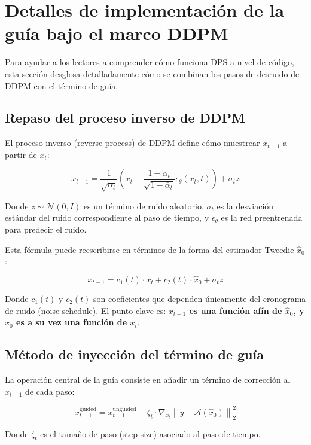 \section{Detalles de implementación de la guía bajo el marco DDPM}

Para ayudar a los lectores a comprender cómo funciona DPS a nivel de código, esta sección desglosa detalladamente cómo se combinan los pasos de desruido de DDPM con el término de guía.

\subsection{Repaso del proceso inverso de DDPM}

El proceso inverso (reverse process) de DDPM define cómo muestrear $x_{t-1}$ a partir de $x_t$:

$$
x_{t-1} = \frac{1}{\sqrt{\alpha_t}} \left( x_t - \frac{1-\alpha_t}{\sqrt{1-\bar{\alpha}_t}} \epsilon_\theta(x_t, t) \right) + \sigma_t z
$$

Donde $z \sim \mathcal{N}(0, I)$ es un término de ruido aleatorio, $\sigma_t$ es la desviación estándar del ruido correspondiente al paso de tiempo, y $\epsilon_\theta$ es la red preentrenada para predecir el ruido.

Esta fórmula puede reescribirse en términos de la forma del estimador Tweedie $\hat{x}_0$:

$$
x_{t-1} = c_1(t) \cdot x_t + c_2(t) \cdot \hat{x}_0 + \sigma_t z
$$

Donde $c_1(t)$ y $c_2(t)$ son coeficientes que dependen únicamente del cronograma de ruido (noise schedule). El punto clave es: \textbf{$x_{t-1}$ es una función afín de $\hat{x}_0$, y $\hat{x}_0$ es a su vez una función de $x_t$}.

\subsection{Método de inyección del término de guía}

La operación central de la guía consiste en añadir un término de corrección al $x_{t-1}$ de cada paso:

$$
x_{t-1}^{\text{guided}} = x_{t-1}^{\text{unguided}} - \zeta_t \cdot \nabla_{x_t} \left\| y - \mathcal{A}(\hat{x}_0) \right\|_2^2
$$

Donde $\zeta_t$ es el tamaño de paso (step size) asociado al paso de tiempo.

